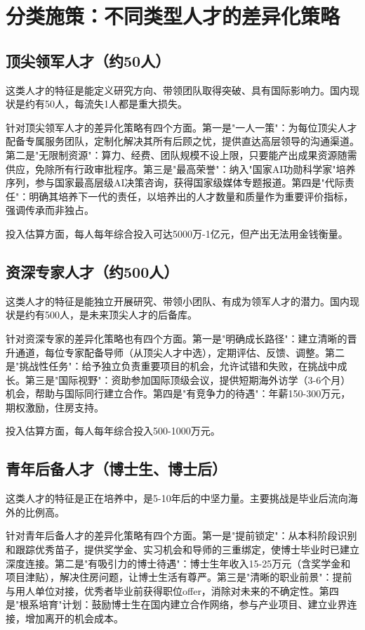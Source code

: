 \section{分类施策：不同类型人才的差异化策略}

\subsection{顶尖领军人才（约50人）}

这类人才的特征是能定义研究方向、带领团队取得突破、具有国际影响力。国内现状是约有50人，每流失1人都是重大损失。

针对顶尖领军人才的差异化策略有四个方面。第一是"一人一策"：为每位顶尖人才配备专属服务团队，定制化解决其所有后顾之忧，提供直达高层领导的沟通渠道。第二是"无限制资源"：算力、经费、团队规模不设上限，只要能产出成果资源随需供应，免除所有行政审批程序。第三是"最高荣誉"：纳入"国家AI功勋科学家"培养序列，参与国家最高层级AI决策咨询，获得国家级媒体专题报道。第四是"代际责任"：明确其培养下一代的责任，以培养出的人才数量和质量作为重要评价指标，强调传承而非独占。

投入估算方面，每人每年综合投入可达5000万-1亿元，但产出无法用金钱衡量。

\subsection{资深专家人才（约500人）}

这类人才的特征是能独立开展研究、带领小团队、有成为领军人才的潜力。国内现状是约有500人，是未来顶尖人才的后备库。

针对资深专家的差异化策略也有四个方面。第一是"明确成长路径"：建立清晰的晋升通道，每位专家配备导师（从顶尖人才中选），定期评估、反馈、调整。第二是"挑战性任务"：给予独立负责重要项目的机会，允许试错和失败，在挑战中成长。第三是"国际视野"：资助参加国际顶级会议，提供短期海外访学（3-6个月）机会，帮助与国际同行建立合作。第四是"有竞争力的待遇"：年薪150-300万元，期权激励，住房支持。

投入估算方面，每人每年综合投入500-1000万元。

\subsection{青年后备人才（博士生、博士后）}

这类人才的特征是正在培养中，是5-10年后的中坚力量。主要挑战是毕业后流向海外的比例高。

针对青年后备人才的差异化策略有四个方面。第一是"提前锁定"：从本科阶段识别和跟踪优秀苗子，提供奖学金、实习机会和导师的三重绑定，使博士毕业时已建立深度连接。第二是"有吸引力的博士待遇"：博士生年收入15-25万元（含奖学金和项目津贴），解决住房问题，让博士生活有尊严。第三是"清晰的职业前景"：提前与用人单位对接，优秀者毕业前获得职位offer，消除对未来的不确定性。第四是"根系培育"计划：鼓励博士生在国内建立合作网络，参与产业项目、建立业界连接，增加离开的机会成本。

